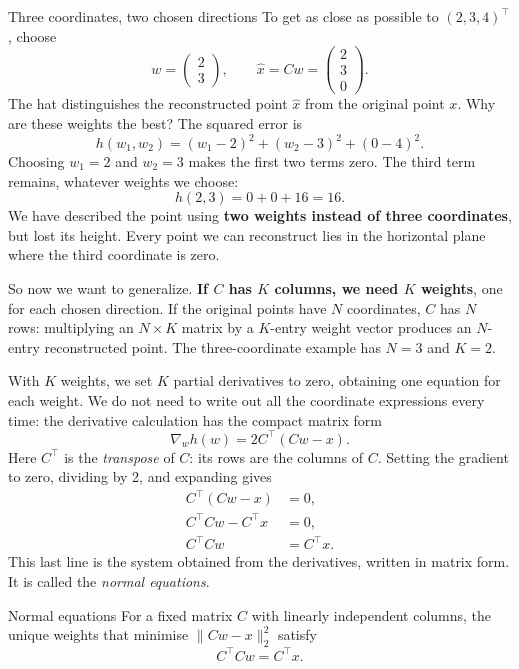 \documentclass[a4paper,12pt,oneside]{report}
\begin{document}
\begin{framedexample}{Three coordinates, two chosen directions}
To get as close as possible to $(2,3,4)^\top$, choose
\[
  w=\begin{pmatrix}2\\3\end{pmatrix},\qquad
  \hat{x}=Cw=\begin{pmatrix}2\\3\\0\end{pmatrix}.
\]
The hat distinguishes the reconstructed point $\hat{x}$ from the
original point $x$. Why are these weights the best? The squared
error is
\[
  h(w_1,w_2)=(w_1-2)^2+(w_2-3)^2+(0-4)^2.
\]
Choosing $w_1=2$ and $w_2=3$ makes the first two terms zero. The
third term remains, whatever weights we choose:
\[
  h(2,3)=0+0+16=16.
\]
We have described the point using \textbf{two weights instead of
three coordinates}, but lost its height. Every point we can
reconstruct lies in the horizontal plane where the third coordinate
is zero.
\end{framedexample}

So now we want to generalize. \textbf{If $C$ has $K$ columns, we
need $K$ weights}, one for each chosen direction. If the original
points have $N$ coordinates, $C$ has $N$ rows: multiplying an
$N\times K$ matrix by a $K$-entry weight vector produces an
$N$-entry reconstructed point. The three-coordinate example has
$N=3$ and $K=2$.

With $K$ weights, we set $K$ partial derivatives to zero, obtaining
one equation for each weight. We do not need to write out all the
coordinate expressions every time: the derivative calculation has
the compact matrix form
\[
  \nabla_w h(w)=2C^\top(Cw-x).
\]
Here $C^\top$ is the \emph{transpose} of $C$: its rows are the
columns of $C$. Setting the gradient to zero, dividing by 2, and
expanding gives
\[
\begin{aligned}
  C^\top(Cw-x)&=0,\\
  C^\top Cw-C^\top x&=0,\\
  C^\top Cw&=C^\top x.
\end{aligned}
\]
This last line is the system obtained from the derivatives, written
in matrix form. It is called the \emph{normal equations}.

\begin{framedprop}{Normal equations}\label{prop:normal-equations}
For a fixed matrix $C$ with linearly independent columns, the unique
weights that minimise $\lVert Cw-x\rVert_2^2$ satisfy
\[
  C^\top Cw=C^\top x.
\]
\end{framedprop}
\end{document}
